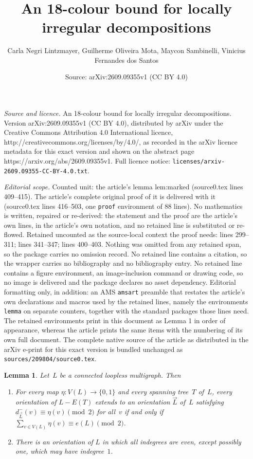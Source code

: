 \documentclass[10pt,a4paper]{amsart}
\title{An 18-colour bound for locally irregular decompositions}
\author{Carla Negri Lintzmayer, Guilherme Oliveira Mota, Maycon Sambinelli, Vinicius Fernandes dos Santos}
\date{Source: arXiv:2609.09355v1 (CC BY 4.0)}
\newtheorem{lemma}{Lemma}
\begin{document}
\maketitle

\noindent\emph{Source and licence.} An 18-colour bound for locally irregular decompositions. Version arXiv:2609.09355v1 (CC BY 4.0), distributed by arXiv under the Creative Commons Attribution 4.0 International licence, http://creativecommons.org/licenses/by/4.0/, as recorded in the arXiv licence metadata for this exact version and shown on the abstract page https://arxiv.org/abs/2609.09355v1. Full licence notice: \texttt{licenses/arxiv-2609.09355-CC-BY-4.0.txt}.\par\smallskip

\noindent\textit{Editorial scope.} Counted unit: the article's lemma lem:marked (source0.tex lines 409--415). The article's complete original proof of it is delivered with it (source0.tex lines 416--503, one \texttt{proof} environment of 88 lines). No mathematics is written, repaired or re-derived: the statement and the proof are the article's own lines, in the article's own notation, and no retained line is substituted or re-flowed.  Retained uncounted as the source-local context the proof needs: lines 299--311; lines 341--347; lines 400--403.  Nothing was omitted from any retained span, so the package carries no omission record.  No retained line contains a citation, so the wrapper carries no bibliography and no bibliography entry.  No retained line contains a figure environment, an image-inclusion command or drawing code, so no image is delivered and the package declares no asset dependency.  Editorial formatting only, in addition: an AMS \texttt{amsart} preamble that restates the article's own declarations and macros used by the retained lines, namely the environments \texttt{lemma} on separate counters, together with the standard packages those lines need.  The retained environments print in this document as Lemma 1 in order of appearance, whereas the article prints the same items with the numbering of its own full document.  The complete native source of the article as distributed in the arXiv e-print for this exact version is bundled unchanged as \texttt{sources/209804/source0.tex}.
\begin{lemma}\label{lem:parity-orientation}
  Let~$L$ be a connected loopless multigraph. 
  Then
  \begin{enumerate}
    \renewcommand{\theenumi}{\roman{enumi}}
    \item For every map $\eta \colon V(L) \to \{0,1\}$ and every spanning tree~$T$
    of~$L$, every orientation of $L-E(T)$ extends to an orientation $\vec L$
    of~$L$ satisfying $d^-_{\vec L}(v) \equiv \eta(v) \pmod 2$ for all~$v$ if and
    only if $\sum_{v \in V(L)} \eta(v) \equiv e(L) \pmod 2$.
    \item There is an orientation of $L$ in which all indegrees are even,
    except possibly one, which may have indegree~$1$.
  \end{enumerate}
\end{lemma}
\end{document}
